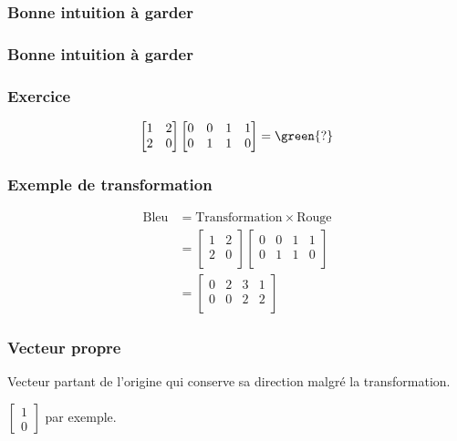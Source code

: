 \begin{frame}
  \frametitle{Bonne intuition à garder}

\end{frame}

\begin{frame}
  \frametitle{Bonne intuition à garder}

\end{frame}

\begin{frame}
  \frametitle{Exercice}
  \[
    \begin{bmatrix}
      1 & 2 \\
      2 & 0 \\
    \end{bmatrix}
    \begin{bmatrix}
      0 & 0 & 1 & 1 \\
      0 & 1 & 1 & 0 \\
    \end{bmatrix}
    = \green{?}
  \]
\end{frame}

\begin{frame}
  \frametitle{Exemple de transformation}

  \[
    \begin{aligned}
      \text{Bleu} & = \text{Transformation} \times \text{Rouge} \\
      & = \begin{bmatrix}
        1 & 2 \\
        2 & 0 \\
      \end{bmatrix}
      \begin{bmatrix}
        0 & 0 & 1 & 1 \\
        0 & 1 & 1 & 0 \\
      \end{bmatrix} \\
      & = \begin{bmatrix}
        0 & 2 & 3 & 1 \\
        0 & 0 & 2 & 2 \\
      \end{bmatrix}
    \end{aligned}
  \]
\end{frame}

\begin{frame}
  \frametitle{Vecteur propre}


  Vecteur partant de l'origine qui conserve sa direction malgré la transformation.

   \pause
  $\begin{bmatrix}1 \\0\end{bmatrix}$ par exemple.
\end{frame}

